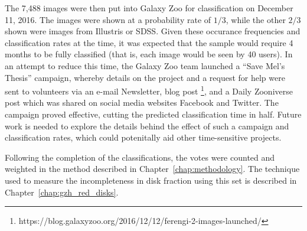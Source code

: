 The 7,488  images were then put into Galaxy Zoo for classification on December 11, 2016. The images were shown at a probability rate of $1/3$, while the other $2/3$ shown were images from Illustris or SDSS. Given these occurance frequencies and classification rates at the time, it was expected that the sample would require 4 months to be fully classified (that is, each image would be seen by 40 users). In an attempt to reduce this time, the Galaxy Zoo team launched a ``Save Mel's Thesis'' campaign, whereby details on the project and a request for help were sent to volunteers via an e-mail Newsletter, blog post \footnote{https://blog.galaxyzoo.org/2016/12/12/ferengi-2-images-launched/}, and a Daily Zooniverse post which was shared on social media websites Facebook and Twitter. The campaign proved effective, cutting the predicted classification time in half. Future work is needed to explore the details behind the effect of such a campaign and classification rates, which could potenitally aid other time-sensitive projects. 

Following the completion of the  classifications, the votes were counted and weighted in the method described in Chapter~\ref{chap:methodology}. The technique used to measure the incompleteness in disk fraction using this set is described in Chapter~\ref{chap:gzh_red_disks}. 




